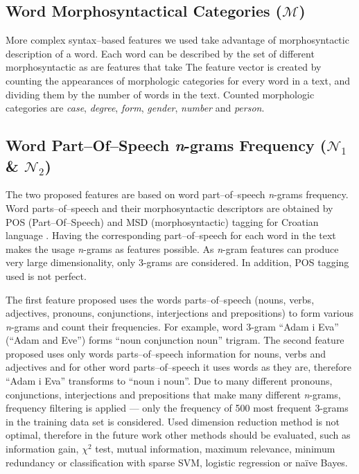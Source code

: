 \documentclass{llncs}
\begin{document}
\subsection{Word Morphosyntactical Categories ($\mathcal{M}$)}
\label{sec:morphosyntactic}

More complex syntax--based features we used take advantage of morphosyntactic
description of a word. Each word can be described by the set of different
morphosyntactic as are features that take The feature vector is created by
counting the appearances of morphologic categories for every word in a text, and dividing them by the number of words in
the text. Counted morphologic categories are \emph{case}, \emph{degree},
\emph{form}, \emph{gender}, \emph{number} and \emph{person}.

\subsection{Word Part--Of--Speech \emph{n}-grams Frequency ($\mathcal{N}_1$ \&
$\mathcal{N}_2$)}
\label{sec:ngrami-tipova}
The two proposed features are based on word part--of--speech \emph{n}-grams
frequency. Word parts--of--speech and their morphosyntactic descriptors are obtained by POS
(Part--Of--Speech) and MSD (morphosyntactic) tagging for Croatian language
\cite{snajder08automatic}. Having the corresponding part--of--speech for
each word in the text makes the usage \emph{n}-grams as features
possible. As \emph{n}-gram features can produce very large dimensionality, 
only 3-grams are considered. In addition, POS tagging used is not perfect. 

The first feature proposed uses the words parts--of--speech
(nouns, verbs, adjectives, pronouns, conjunctions, interjections and
prepositions) to form various \emph{n}-grams and count their frequencies. For
example, word 3-gram ``Adam i Eva'' (``Adam and Eve'') forms ``noun
conjunction noun'' trigram. The second feature proposed uses only words
parts--of--speech information for nouns, verbs and adjectives and for other word
parts--of--speech it uses words as they are, therefore ``Adam i Eva'' transforms
to ``noun i noun''. Due to many different pronouns, conjunctions, interjections
and prepositions that make many different \emph{n}-grams, frequency filtering
is applied --- only the frequency of 500 most frequent 3-grams in the
training data set is considered. Used dimension reduction method is not optimal,
therefore in the future work other methods should be evaluated, such as information
gain, $\chi^2$ test, mutual information, maximum relevance, minimum redundancy
or classification with sparse SVM, logistic regression or na\"ive Bayes.
\end{document}
